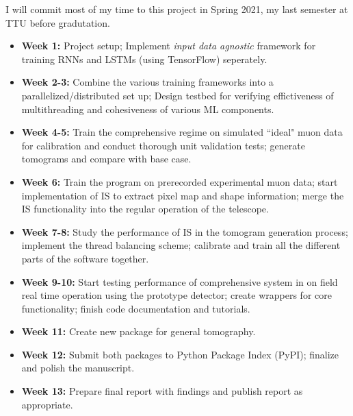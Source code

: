 \documentclass[10pt]{article}
\begin{document}
I will commit most of my time to this project in Spring 2021, my last semester at TTU before gradutation.

\begin{itemize}
    \item \textbf{Week 1:} Project setup; Implement \textit{input data agnostic} framework for training RNNs and LSTMs (using TensorFlow) seperately. \\
    \item \textbf{Week 2-3:} Combine the various training frameworks into a parallelized/distributed set up; Design testbed for verifying effictiveness of multithreading and cohesiveness of various ML components. \\
    \item \textbf{Week 4-5:} Train the comprehensive regime on simulated ``ideal" muon data for calibration and conduct thorough unit validation tests; generate tomograms and compare with base case.\\
    \item \textbf{Week 6:} Train the program on prerecorded experimental muon data; start implementation of IS to extract pixel map and shape information; merge the IS functionality into the regular operation of the telescope.\\
    \item \textbf{Week 7-8:} Study the performance of IS in the tomogram generation process; implement the thread balancing scheme; calibrate and train all the different parts of the software together. \\
    \item \textbf{Week 9-10:} Start testing performance of comprehensive system in on field real time operation using the prototype detector; create wrappers for core functionality; finish code documentation and tutorials. \\
    \item \textbf{Week 11:} Create new package for general tomography.\\
    \item \textbf{Week 12:} Submit both packages to Python Package Index (PyPI); finalize and polish the manuscript.
    \item \textbf{Week 13:} Prepare final report with findings and publish report as appropriate. \\
\end{itemize}

\end{document}
